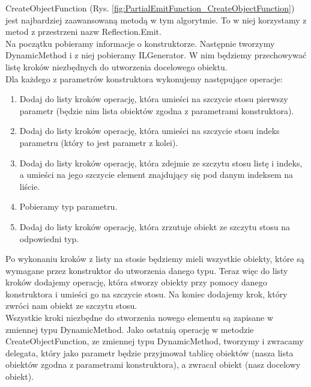 \documentclass[12pt]{article}
\begin{document}
CreateObjectFunction (Rys. \ref{fig:PartialEmitFunction_CreateObjectFunction}) jest najbardziej zaawansowaną metodą w tym algorytmie. To w niej korzystamy z metod z przestrzeni nazw Reflection.Emit.\\
Na początku pobieramy informacje o konstruktorze. Następnie tworzymy DynamicMethod i z niej pobieramy ILGenerator. W nim będziemy przechowywać listę kroków niezbędnych do utworzenia docelowego obiektu.\\
Dla każdego z parametrów konstruktora wykonujemy następujące operacje:
\begin{enumerate}
	\item Dodaj do listy kroków operację, która umieści na szczycie stosu pierwszy parametr (będzie nim lista obiektów zgodna z parametrami konstruktora).
	\item Dodaj do listy kroków operację, która umieści na szczycie stosu indeks parametru (który to jest parametr z kolei).
	\item Dodaj do listy kroków operację, która zdejmie ze szczytu stosu listę i indeks, a umieści na jego szczycie element znajdujący się pod danym indeksem na liście.
	\item Pobieramy typ parametru.
	\item Dodaj do listy kroków operację, która zrzutuje obiekt ze szczytu stosu na odpowiedni typ.
\end{enumerate}
Po wykonaniu kroków z listy na stosie będziemy mieli wszystkie obiekty, które są wymagane przez konstruktor do utworzenia danego typu. Teraz więc do listy kroków dodajemy operację, która stworzy obiekty przy pomocy danego konstruktora i umieści go na szczycie stosu. Na koniec dodajemy krok, który zwróci nam obiekt ze szczytu stosu.\\
Wszystkie kroki niezbędne do stworzenia nowego elementu są zapisane w zmiennej typu DynamicMethod. Jako ostatnią operację w metodzie CreateObjectFunction, ze zmiennej typu DynamicMethod, tworzymy i zwracamy delegata, który jako parametr będzie przyjmował tablicę obiektów (nasza lista obiektów zgodna z parametrami konstruktora), a zwracał obiekt (nasz docelowy obiekt).\\ \\
\end{document}
